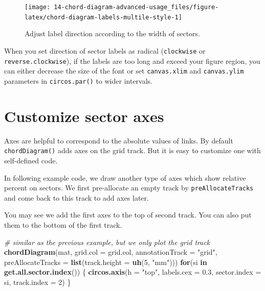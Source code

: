 \documentclass[]{book}
\newenvironment{Shaded}{\begin{snugshade}}{\end{snugshade}}
\newcommand{\KeywordTok}[1]{\textcolor[rgb]{0.13,0.29,0.53}{\textbf{#1}}}
\newcommand{\DataTypeTok}[1]{\textcolor[rgb]{0.13,0.29,0.53}{#1}}
\newcommand{\DecValTok}[1]{\textcolor[rgb]{0.00,0.00,0.81}{#1}}
\newcommand{\FloatTok}[1]{\textcolor[rgb]{0.00,0.00,0.81}{#1}}
\newcommand{\StringTok}[1]{\textcolor[rgb]{0.31,0.60,0.02}{#1}}
\newcommand{\CommentTok}[1]{\textcolor[rgb]{0.56,0.35,0.01}{\textit{#1}}}
\newcommand{\ControlFlowTok}[1]{\textcolor[rgb]{0.13,0.29,0.53}{\textbf{#1}}}
\newcommand{\NormalTok}[1]{#1}
\theoremstyle{definition}
\theoremstyle{definition}
\theoremstyle{remark}
\begin{document}
\begin{figure}

{\centering \texttt{[image: 14-chord-diagram-advanced-usage\_files/figure-latex/chord-diagram-labels-multile-style-1]} 

}

\caption{Adjust label direction according to the width of sectors.}\label{fig:chord-diagram-labels-multile-style}
\end{figure}

When you set direction of sector labels as radical (\texttt{clockwise}
or \texttt{reverse.clockwise}), if the labels are too long and exceed
your figure region, you can either decrease the size of the font or set
\texttt{canvas.xlim} and \texttt{canvas.ylim} parameters in
\texttt{circos.par()} to wider intervals.

\section{Customize sector axes}\label{customize-sector-axes}

Axes are helpful to correspond to the absolute values of links. By
default \texttt{chordDiagram()} adds axes on the grid track. But it is
easy to customize one with self-defined code.

In following example code, we draw another type of axes which show
relative percent on sectors. We first pre-allocate an empty track by
\texttt{preAllocateTracks} and come back to this track to add axes
later.

You may see we add the first axes to the top of second track. You can
also put them to the bottom of the first track.

\begin{Shaded}
\begin{Highlighting}[]
\CommentTok{# similar as the previous example, but we only plot the grid track}
\KeywordTok{chordDiagram}\NormalTok{(mat, }\DataTypeTok{grid.col =}\NormalTok{ grid.col, }\DataTypeTok{annotationTrack =} \StringTok{"grid"}\NormalTok{, }
    \DataTypeTok{preAllocateTracks =} \KeywordTok{list}\NormalTok{(}\DataTypeTok{track.height =} \KeywordTok{uh}\NormalTok{(}\DecValTok{5}\NormalTok{, }\StringTok{"mm"}\NormalTok{)))}
\ControlFlowTok{for}\NormalTok{(si }\ControlFlowTok{in} \KeywordTok{get.all.sector.index}\NormalTok{()) \{}
    \KeywordTok{circos.axis}\NormalTok{(}\DataTypeTok{h =} \StringTok{"top"}\NormalTok{, }\DataTypeTok{labels.cex =} \FloatTok{0.3}\NormalTok{, }\DataTypeTok{sector.index =}\NormalTok{ si, }\DataTypeTok{track.index =} \DecValTok{2}\NormalTok{)}
\NormalTok{\}}
\end{Highlighting}
\end{Shaded}
\end{document}
